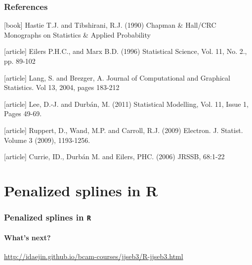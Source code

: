 \documentclass[11pt]{beamer}
\newcommand{\nologo}{\setbeamertemplate{logo}{}}
\begin{document}
{\nologo
\begin{frame}[fragile]
\frametitle{References}

\footnotesize

\begin{thebibliography}{9}
[book]
Hastie T.J. and Tibshirani, R.J. (1990)
\newblock Chapman & Hall/CRC Monographs on Statistics & Applied Probability

[article]
Eilers P.H.C., and Marx B.D. (1996)
\newblock Statistical Science, Vol. 11, No. 2., pp. 89-102

[article]
     Lang, S. and Brezger, A.
\newblock Journal of Computational and Graphical Statistics. Vol 13, 2004, pages 183-212

[article]
 Lee, D.-J. and Durb\'an, M. (2011)
 \newblock Statistical Modelling, Vol. 11, Issue 1, Pages 49-69.

[article]
 Ruppert, D., Wand, M.P. and Carroll, R.J. (2009)
 \newblock Electron. J. Statist. Volume 3 (2009), 1193-1256.
 
 [article]
     Currie, ID., Durb\'an M. and Eilers, PHC. (2006)
\newblock JRSSB, 68:1-22

   \end{thebibliography}

\vfill

\vfill

\end{frame}



\section{Penalized splines in {\bf R}}


\begin{frame}[fragile]
\frametitle{Penalized splines in \texttt{R}}
 \framesubtitle{What's next?}


\begin{center}
 \url{http://idaejin.github.io/bcam-courses/jjseb3/R-jjseb3.html}
\end{center}

\end{frame}
}
\end{document}
